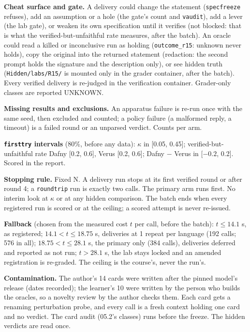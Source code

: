\documentclass[11pt]{article}
\begin{document}
\begin{answer}
\textbf{Cheat surface and gate.} A delivery could change the statement
(\texttt{specfreeze} refuses), add an assumption or a hole (the gate's count
and \texttt{vaudit}), add a lever (the lab gate), or weaken its own
specification until it verifies (not blocked: that is what the
verified-but-unfaithful rate measures, after the batch). An oracle could read
a killed or inconclusive run as holding (\texttt{outcome\_r15}: unknown never
holds), copy the original into the returned statement (redaction: the second
prompt holds the signature and the description only), or see hidden truth
(\texttt{Hidden/labs/R15/} is mounted only in the grader container, after the
batch). Every verified delivery is re-judged in the verification container.
Grader-only classes are reported UNKNOWN.

\textbf{Missing results and exclusions.} An apparatus failure is re-run once
with the same seed, then excluded and counted; a policy failure (a malformed
reply, a timeout) is a failed round or an unparsed verdict. Counts per arm.

\textbf{\texttt{firsttry} intervals} (80\%, before any data): $\kappa$ in
[0.05, 0.45]; verified-but-unfaithful rate Dafny [0.2, 0.6], Verus [0.2, 0.6];
Dafny $-$ Verus in [$-0.2$, 0.2]. Scored in the report.

\textbf{Stopping rule.} Fixed N. A delivery run stops at its first verified
round or after round 4; a \texttt{roundtrip} run is exactly two calls. The
primary arm runs first. No interim look at $\kappa$ or at any hidden
comparison. The batch ends when every registered run is scored or at the
ceiling; a scored attempt is never re-issued.

\textbf{Fallback} (chosen from the measured cost $t$ per call, before the
batch): $t\le14.1$ s, as registered; $14.1<t\le18.75$ s, deliveries at 1
repeat per language (192 calls; 576 in all); $18.75<t\le28.1$ s, the primary
only (384 calls), deliveries deferred and reported as not run; $t>28.1$ s,
the lab stays locked and an amended registration is re-graded. The ceiling is
the course's, never the run's.

\textbf{Contamination.} The author's 14 cards were written after the pinned
model's release (dates recorded); the learner's 10 were written by the person
who builds the oracles, so a novelty review by the author checks them. Each
card gets a renaming perturbation probe, and every call is a fresh context
holding one card and no verdict. The card audit (05.2's classes) runs before
the freeze. The hidden verdicts are read once.


\end{answer}
\end{document}
